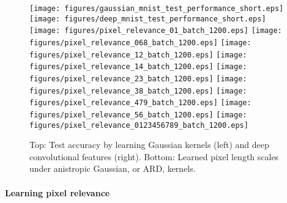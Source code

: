 \documentclass[twoside]{article}
\begin{document}
	\begin{figure*}[t]
		\centering 
		\texttt{[image: figures/gaussian\_mnist\_test\_performance\_short.eps]}
		\texttt{[image: figures/deep\_mnist\_test\_performance\_short.eps]}
		\texttt{[image: figures/pixel\_relevance\_01\_batch\_1200.eps]}
		\texttt{[image: figures/pixel\_relevance\_068\_batch\_1200.eps]}
		\texttt{[image: figures/pixel\_relevance\_12\_batch\_1200.eps]}
		\texttt{[image: figures/pixel\_relevance\_14\_batch\_1200.eps]}
		\texttt{[image: figures/pixel\_relevance\_23\_batch\_1200.eps]}
		\texttt{[image: figures/pixel\_relevance\_38\_batch\_1200.eps]}
		\texttt{[image: figures/pixel\_relevance\_479\_batch\_1200.eps]}
		\texttt{[image: figures/pixel\_relevance\_56\_batch\_1200.eps]}
		\texttt{[image: figures/pixel\_relevance\_0123456789\_batch\_1200.eps]}
		\caption{Top: Test accuracy by learning Gaussian kernels (left) and deep convolutional features (right). Bottom: Learned pixel length scales under anistropic Gaussian, or \gls{ARD}, kernels.}
		\label{fig:mnist_experiments}
	\end{figure*}
	
	\paragraph{Learning pixel relevance}
	
\end{document}
